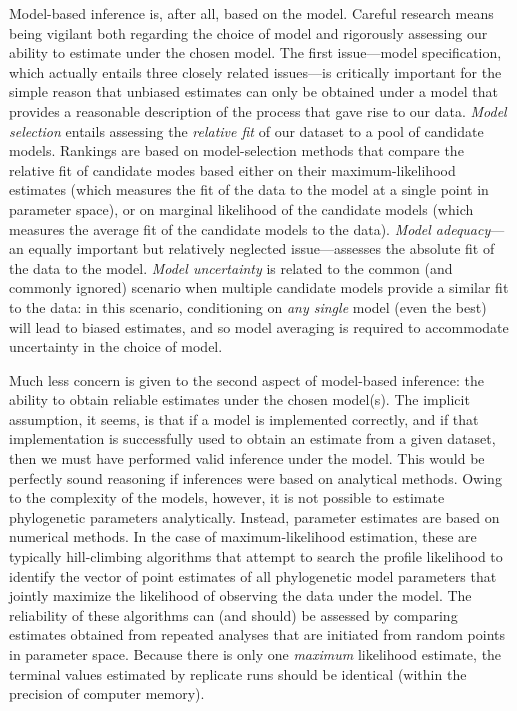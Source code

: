 \documentclass[11pt]{article}
\begin{document}
\bigskip
Model-based inference is, after all, based on the model.
Careful research means being vigilant both regarding the choice of model and rigorously assessing our ability to estimate under the chosen model. 
The first issue---model specification, which actually entails three closely related issues---is critically important for the simple reason that unbiased estimates can only be obtained under a model that provides a reasonable description of the process that gave rise to our data. 
{\it Model selection} entails assessing the {\it relative fit} of our dataset to a pool of candidate models. 
Rankings are based on model-selection methods that compare the relative fit of candidate modes based either on their maximum-likelihood estimates (which measures the fit of the data to the model at a single point in parameter space), or on marginal likelihood of the candidate models (which measures the average fit of the candidate models to the data). 
{\it Model adequacy}---an equally important but relatively neglected issue---assesses the absolute fit of the data to the model. 
{\it Model uncertainty} is related to the common (and commonly ignored) scenario when multiple candidate models provide a similar fit to the data: in this scenario, conditioning on {\it any single} model (even the best) will lead to biased estimates, and so model averaging is required to accommodate uncertainty in the choice of model.

Much less concern is given to the second aspect of model-based inference: the ability to obtain reliable estimates under the chosen model(s). 
The implicit assumption, it seems, is that if a model is implemented correctly, and if that implementation is  successfully used to obtain an estimate from a given dataset, then we must have performed valid inference under the model. 
This would be perfectly sound reasoning if inferences were based on analytical methods. 
Owing to the complexity of the models, however, it is not possible to estimate phylogenetic parameters analytically.
Instead, parameter estimates are based on numerical methods. In the case of maximum-likelihood estimation, these are typically hill-climbing algorithms that attempt to search the profile likelihood to identify the vector of point estimates of all phylogenetic model parameters that jointly maximize the likelihood of observing the data under the model. 
The reliability of these algorithms can (and should) be assessed by comparing estimates obtained from repeated analyses that are initiated from random points in parameter space. 
Because there is only one {\it maximum} likelihood estimate, the terminal values estimated by replicate runs should be identical (within the precision of computer memory).
\end{document}
